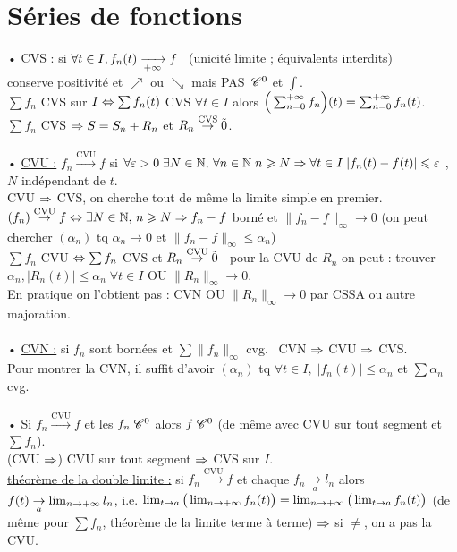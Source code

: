 \documentclass[12 pt]{exampleclass}
\begin{document}
\section{Séries de fonctions}
• \underline{CVS :} si $\forall t\in I, f_n(t)\xrightarrow[+\infty]{} f$ \ (unicité limite ; équivalents interdits)\\
conserve positivité et $\nearrow$ ou $\searrow$ mais PAS $\, \mathscr{C}^0$ et $\int$.\\
$\sum f_n$ CVS sur $I \Leftrightarrow \sum f_n(t)$ CVS $\forall t\in I$ alors $\Big(\sum_{n=0}^{+\infty} f_n \Big)(t) = \sum_{n=0}^{+\infty} f_n(t)$.\\
$\sum f_n$ CVS $\Rightarrow S= S_n + R_n$ et $R_n \overset{\text{CVS}}{\to} \Tilde{0}$.\\
\text{}\\
• \underline{CVU :} $f_n \overset{\text{CVU}}{\to} f$ si $\forall\varepsilon>0 \; \exists N\in \mathbb{N},\, \forall n \in \mathbb{N} \; n\geqslant N \Rightarrow \forall t\in I\; |f_n(t)-f(t)|\leqslant\varepsilon$ , $N$ indépendant de $t$.\\
CVU $\Rightarrow$ CVS, on cherche tout de même la limite simple en premier.\\
$(f_n)\overset{\text{CVU}}{\to} f \Leftrightarrow \exists N\in\mathbb{N}, \, n\geqslant N \Rightarrow f_n -f$ borné et $\| f_n -f\|_\infty \to 0$ (on peut chercher $(\alpha_n)$ tq $\alpha_n \to 0$ et $\|f_n-f\|_\infty \leqslant\alpha_n$)\\
$\sum f_n$ CVU $\Leftrightarrow \sum f_n$ CVS et $R_n \overset{\text{CVU}}{\rightarrow}\Tilde{0}$ \ pour la CVU de $R_n$ on peut : trouver $\alpha_n, |R_n(t)|\leqslant \alpha_n \; \forall t\in I$ OU $\|R_n\|_\infty \to 0$.\\
En pratique on l'obtient pas : CVN OU $\|R_n\|_\infty \to 0$ par CSSA ou autre majoration.\\
\text{}\\
• \underline{CVN :} si $f_n$ sont bornées et $\sum \| f_n\|_\infty$ cvg. \ CVN $\Rightarrow$ CVU $\Rightarrow$ CVS.\\
Pour montrer la CVN, il suffit d'avoir $(\alpha_n)$ tq $\forall t\in I, \; |f_n(t)|\leqslant \alpha_n$ et $\sum\alpha_n$ cvg.\\
\text{}\\
• Si $f_n\overset{\text{CVU}}{\to}f$ et les $f_n \; \mathscr{C}^0$ alors $f \; \mathscr{C}^0$ (de même avec CVU sur tout segment et $\sum f_n$).\\
(CVU $\Rightarrow$) CVU sur tout segment $\Rightarrow$ CVS sur $I$.\\
\underline{théorème de la double limite :} si $f_n\overset{\text{CVU}}{\to} f$ et chaque $f_n\underset{a}{\to} l_n$ alors $f(t)\underset{a}{\to} \lim_{n\to +\infty} l_n$, i.e. $\lim_{t\to a}\big(\lim_{n\to +\infty} f_n(t)\big) = \lim_{n\to +\infty} \big(\lim_{t\to a} f_n(t)\big)$ \; (de même pour $\sum f_n$, théorème de la limite terme à terme) $\Rightarrow$ si $\neq$, on a pas la CVU.\\
\end{document}
